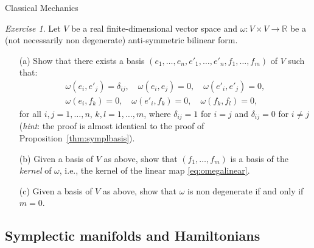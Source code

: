 \documentclass[oneside,a4paper,11pt]{amsbook}
\newcommand{\R}{\mathds R}
\theoremstyle{remark}\newtheorem{exercise}{Exercise}[chapter]
\theoremstyle{plain}\newtheorem{teo}{Theorem}[section]
\theoremstyle{plain}\newtheorem{lem}[teo]{Lemma}
\theoremstyle{plain}\newtheorem{prop}[teo]{Proposition}
\theoremstyle{plain}\newtheorem{cor}[teo]{Corollary}
\theoremstyle{definition}\newtheorem{defin}[teo]{Definition}
\theoremstyle{remark}\newtheorem{rem}[teo]{Remark}
\theoremstyle{definition}\newtheorem{notation}[teo]{Notation}
\theoremstyle{definition}\newtheorem{convention}[teo]{Convention}
\theoremstyle{definition}\newtheorem{example}[teo]{Example}
\numberwithin{section}{chapter}
\numberwithin{equation}{section}
\begin{document}
\begin{chapter}{Classical Mechanics}
\begin{exercise}\label{exe:symplbasisbetter}
Let $V$ be a real finite-dimensional vector space and $\omega:V\times V\to\R$ be a (not necessarily non degenerate)
anti-symmetric bilinear form.
\begin{itemize}
\item[(a)] Show that there exists a basis $(e_1,\ldots,e_n,e'_1,\ldots,e'_n,f_1,\ldots,f_m)$
of $V$ such that:
\begin{gather*}
\omega(e_i,e'_j)=\delta_{ij},\quad\omega(e_i,e_j)=0,\quad\omega(e'_i,e'_j)=0,\\
\omega(e_i,f_k)=0,\quad\omega(e'_i,f_k)=0,\quad\omega(f_k,f_l)=0,
\end{gather*}
for all $i,j=1,\ldots,n$, $k,l=1,\ldots,m$, where $\delta_{ij}=1$ for $i=j$ and $\delta_{ij}=0$ for $i\ne j$
({\em hint}: the proof is almost identical to the proof of Proposition~\ref{thm:symplbasis}).
\item[(b)] Given a basis of $V$ as above, show that $(f_1,\ldots,f_m)$ is a basis of the {\em kernel\/}
of $\omega$, i.e., the kernel of the linear map \eqref{eq:omegalinear}.
\item[(c)] Given a basis of $V$ as above, show that $\omega$ is non degenerate if and only if $m=0$.
\end{itemize}
\end{exercise}

\subsection*{Symplectic manifolds and Hamiltonians}


\end{chapter}
\end{document}
